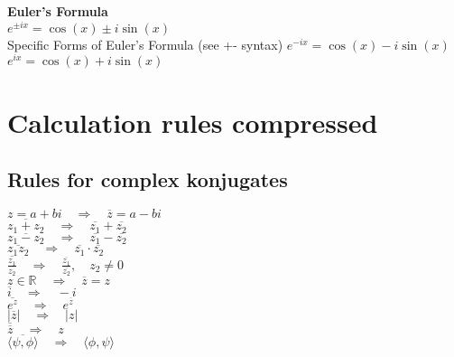 \documentclass[a4paper,7pt,fleqn]{article}
\begin{document}
\begin{multicols}{3}
\begin{minipage}{\linewidth}
\textbf{Euler's Formula} \\
\(     e^{\pm ix} = \cos(x) \pm i \sin(x) \) \\
Specific Forms of Euler's Formula (see +- syntax)
\(     e^{-ix} = \cos(x) - i \sin(x) \) \\
\(     e^{ix} = \cos(x) + i \sin(x) \) \\




\end{minipage}











\newpage
\section{Calculation rules compressed}


\begin{minipage}{\linewidth}
\subsection{Rules for complex konjugates}

\( z = a + bi \quad \Rightarrow \quad \overline{z} = a - bi \)\\
\( \overline{z_1 + z_2} \quad \Rightarrow \quad \overline{z_1} + \overline{z_2} \)\\
\( \overline{z_1 - z_2} \quad \Rightarrow \quad \overline{z_1} - \overline{z_2} \)\\
\( \overline{z_1 z_2} \quad \Rightarrow \quad \overline{z_1} \cdot \overline{z_2} \)\\
\( \overline{\frac{z_1}{z_2}} \quad \Rightarrow \quad \frac{\overline{z_1}}{\overline{z_2}}, \quad z_2 \neq 0 \)\\
\( z \in \mathbb{R} \quad \Rightarrow \quad \overline{z} = z \)\\
\( \overline{i} \quad \Rightarrow \quad -i \)\\
\( \overline{e^z} \quad \Rightarrow \quad e^{\overline{z}} \)\\
\( |\overline{z}| \quad \Rightarrow \quad |z| \)\\
\( \overline{\overline{z}} \quad \Rightarrow \quad z \)\\
\( \overline{\langle \psi, \phi \rangle} \quad \Rightarrow \quad \langle \phi, \psi \rangle \)\\



\end{minipage}
\end{multicols}
\end{document}
